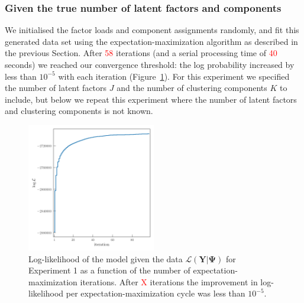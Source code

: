 \documentclass[twocolumn]{aastex61}
\newcommand{\todo}[1]{\textcolor{red}{#1}}
\newcommand{\vect}[1]{\boldsymbol{\mathbf{#1}}}
\renewcommand{\vec}[1]{\vect{#1}}
\newcommand{\data}{\textbf{Y}}
\newcommand{\NumLatentFactors}{J}
\newcommand{\NumComponents}{K}
\begin{document}


\subsubsection{Given the true number of latent factors and components}

We initialised the factor loads and component assignments randomly, and
fit this generated data set using the expectation-maximization algorithm
as described in the previous Section. After \todo{58} iterations
(and a serial processing time of \todo{40} seconds) we
reached our convergence threshold: the log probability increased by
less than $10^{-5}$ with each iteration (Figure~\ref{fig:exp1-ll-iterations}). For this experiment we specified
the number of latent factors $\NumLatentFactors$ and the number of clustering components
$\NumComponents$ to include, but below we repeat this experiment where the number
of latent factors and clustering components is not known.

\begin{figure}
	\includegraphics[width=0.5\textwidth]{experiments/exp1-ll-iterations.png}
	\caption{Log-likelihood of the model given the data $\mathcal{L}\left(\vec\data|\vec\Psi\right)$ for Experiment 1 as a function of the number of expectation-maximization iterations. After \todo{X} iterations the improvement in log-likelihood per
    expectation-maximization cycle was less than $10^{-5}$.}
    \label{fig:exp1-ll-iterations}
\end{figure}
\end{document}

